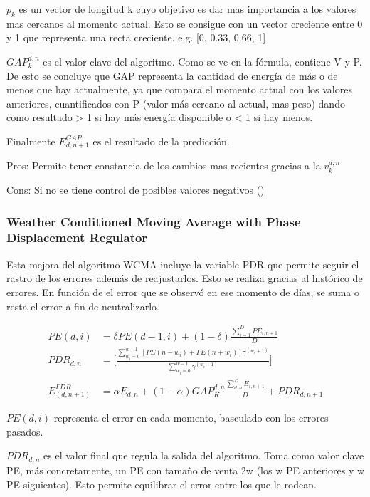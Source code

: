 $p_k$ es un vector de longitud k cuyo objetivo es dar mas importancia a los valores mas cercanos al momento actual. Esto se consigue con un vector creciente entre 0 y 1 que representa una recta creciente. e.g. [0, 0.33, 0.66, 1]

$GAP_k^{d,n}$ es el valor clave del algoritmo. Como se ve en la fórmula, contiene V y P. De esto se concluye que GAP representa la cantidad de energía de más o de menos que hay actualmente, ya que compara el momento actual con los valores anteriores, cuantificados con P (valor más cercano al actual, mas peso) dando como resultado > 1 si hay más energía disponible o < 1 si hay menos.

Finalmente $E^{GAP}_{d,n+1}$ es el resultado de la predicción.


Pros: Permite tener constancia de los cambios mas recientes gracias a la $v^{d,n}_k$

Cons: Si no se tiene control de posibles valores negativos ()


\subsubsection{ Weather Conditioned Moving Average with Phase Displacement Regulator} 
\label{ssub:subsubsection_name}

Esta mejora del algoritmo WCMA incluye la variable PDR que permite seguir el rastro de los errores además de reajustarlos. Esto se realiza gracias al histórico de errores. En función de el error que se observó en ese momento de días, se suma o resta el error a fin de neutralizarlo. 

\begin{align}
	PE(d,i) &= \delta PE(d-1,i) + (1-\delta) \frac  {\sum_{i=1}^D PE_{i,n+1}} {D} \\
	PDR_{d,n} &= \bigg[ \frac{\sum^{w-1}_{w_i = 0} [ PE(n-w_i) + PE(n+w_i) ] \gamma^{(w_i + 1)}}{\sum_{w_i = 0}^{w - 1} \gamma^{(w_i + 1)}} \bigg] \\
	E^{PDR}_(d,n+1) &= \alpha E_{d,n} + (1-\alpha ) GAP^{d,n}_K \frac{\sum^D_{d,n} E_{i,n+1} }{D} + PDR_{d,n+1}
\end{align}

$PE(d,i)$ representa el error en cada momento, basculado con los errores pasados.

$PDR_{d,n}$ es el valor final que regula la salida del algoritmo. Toma como valor clave PE, más concretamente, un PE con tamaño de venta 2w (los w PE anteriores y w PE siguientes). Esto permite equilibrar el error entre los que le rodean. 

